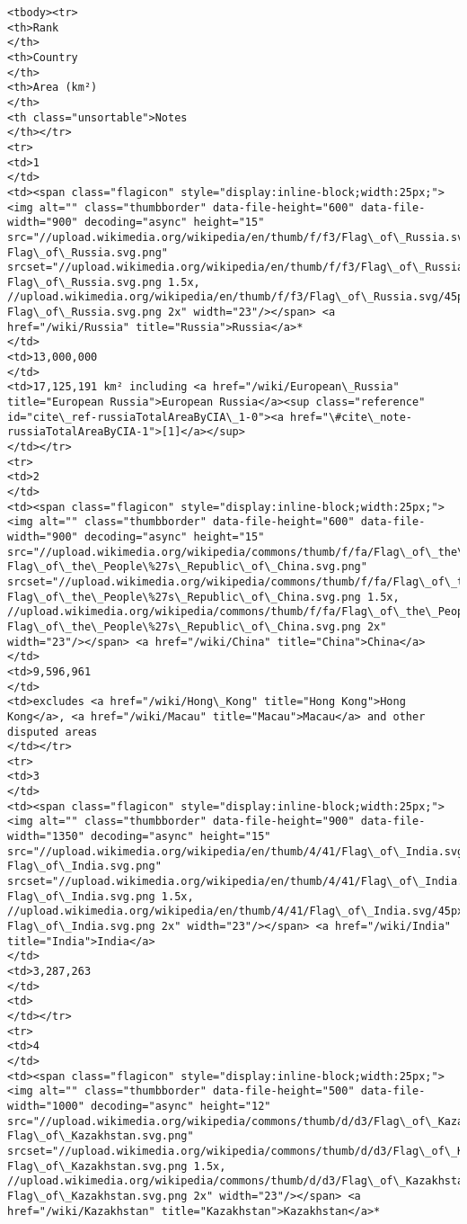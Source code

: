 \documentclass[11pt]{article}
\begin{document}
\begin{Verbatim}[commandchars=\\\{\}]
<tbody><tr>
<th>Rank
</th>
<th>Country
</th>
<th>Area (km²)
</th>
<th class="unsortable">Notes
</th></tr>
<tr>
<td>1
</td>
<td><span class="flagicon" style="display:inline-block;width:25px;"><img alt="" class="thumbborder" data-file-height="600" data-file-width="900" decoding="async" height="15" src="//upload.wikimedia.org/wikipedia/en/thumb/f/f3/Flag\_of\_Russia.svg/23px-Flag\_of\_Russia.svg.png" srcset="//upload.wikimedia.org/wikipedia/en/thumb/f/f3/Flag\_of\_Russia.svg/35px-Flag\_of\_Russia.svg.png 1.5x, //upload.wikimedia.org/wikipedia/en/thumb/f/f3/Flag\_of\_Russia.svg/45px-Flag\_of\_Russia.svg.png 2x" width="23"/></span> <a href="/wiki/Russia" title="Russia">Russia</a>*
</td>
<td>13,000,000
</td>
<td>17,125,191 km² including <a href="/wiki/European\_Russia" title="European Russia">European Russia</a><sup class="reference" id="cite\_ref-russiaTotalAreaByCIA\_1-0"><a href="\#cite\_note-russiaTotalAreaByCIA-1">[1]</a></sup>
</td></tr>
<tr>
<td>2
</td>
<td><span class="flagicon" style="display:inline-block;width:25px;"><img alt="" class="thumbborder" data-file-height="600" data-file-width="900" decoding="async" height="15" src="//upload.wikimedia.org/wikipedia/commons/thumb/f/fa/Flag\_of\_the\_People\%27s\_Republic\_of\_China.svg/23px-Flag\_of\_the\_People\%27s\_Republic\_of\_China.svg.png" srcset="//upload.wikimedia.org/wikipedia/commons/thumb/f/fa/Flag\_of\_the\_People\%27s\_Republic\_of\_China.svg/35px-Flag\_of\_the\_People\%27s\_Republic\_of\_China.svg.png 1.5x, //upload.wikimedia.org/wikipedia/commons/thumb/f/fa/Flag\_of\_the\_People\%27s\_Republic\_of\_China.svg/45px-Flag\_of\_the\_People\%27s\_Republic\_of\_China.svg.png 2x" width="23"/></span> <a href="/wiki/China" title="China">China</a>
</td>
<td>9,596,961
</td>
<td>excludes <a href="/wiki/Hong\_Kong" title="Hong Kong">Hong Kong</a>, <a href="/wiki/Macau" title="Macau">Macau</a> and other disputed areas
</td></tr>
<tr>
<td>3
</td>
<td><span class="flagicon" style="display:inline-block;width:25px;"><img alt="" class="thumbborder" data-file-height="900" data-file-width="1350" decoding="async" height="15" src="//upload.wikimedia.org/wikipedia/en/thumb/4/41/Flag\_of\_India.svg/23px-Flag\_of\_India.svg.png" srcset="//upload.wikimedia.org/wikipedia/en/thumb/4/41/Flag\_of\_India.svg/35px-Flag\_of\_India.svg.png 1.5x, //upload.wikimedia.org/wikipedia/en/thumb/4/41/Flag\_of\_India.svg/45px-Flag\_of\_India.svg.png 2x" width="23"/></span> <a href="/wiki/India" title="India">India</a>
</td>
<td>3,287,263
</td>
<td>
</td></tr>
<tr>
<td>4
</td>
<td><span class="flagicon" style="display:inline-block;width:25px;"><img alt="" class="thumbborder" data-file-height="500" data-file-width="1000" decoding="async" height="12" src="//upload.wikimedia.org/wikipedia/commons/thumb/d/d3/Flag\_of\_Kazakhstan.svg/23px-Flag\_of\_Kazakhstan.svg.png" srcset="//upload.wikimedia.org/wikipedia/commons/thumb/d/d3/Flag\_of\_Kazakhstan.svg/35px-Flag\_of\_Kazakhstan.svg.png 1.5x, //upload.wikimedia.org/wikipedia/commons/thumb/d/d3/Flag\_of\_Kazakhstan.svg/46px-Flag\_of\_Kazakhstan.svg.png 2x" width="23"/></span> <a href="/wiki/Kazakhstan" title="Kazakhstan">Kazakhstan</a>*

\end{Verbatim}
\end{document}
